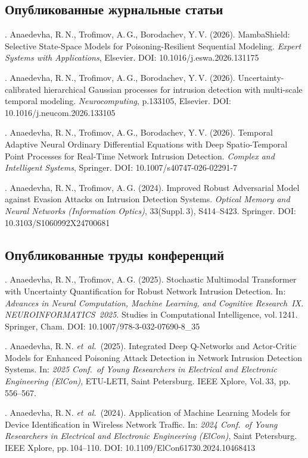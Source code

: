 \subsection*{Опубликованные журнальные статьи}

. Anaedevha, R.\,N., Trofimov, A.\,G., Borodachev, Y.\,V. (2026). MambaShield: Selective State-Space Models for Poisoning-Resilient Sequential Modeling. \textit{Expert Systems with Applications}, Elsevier. DOI: 10.1016/j.eswa.2026.131175

. Anaedevha, R.\,N., Trofimov, A.\,G., Borodachev, Y.\,V. (2026). Uncertainty-calibrated hierarchical Gaussian processes for intrusion detection with multi-scale temporal modeling. \textit{Neurocomputing}, p.133105, Elsevier. DOI: 10.1016/j.neucom.2026.133105

. Anaedevha, R.\,N., Trofimov, A.\,G., Borodachev, Y.\,V. (2026). Temporal Adaptive Neural Ordinary Differential Equations with Deep Spatio-Temporal Point Processes for Real-Time Network Intrusion Detection. \textit{Complex and Intelligent Systems}, Springer. DOI: 10.1007/s40747-026-02291-7

. Anaedevha, R.\,N., Trofimov, A.\,G. (2024). Improved Robust Adversarial Model against Evasion Attacks on Intrusion Detection Systems. \textit{Optical Memory and Neural Networks (Information Optics)}, 33(Suppl.\,3), S414--S423. Springer. DOI: 10.3103/S1060992X24700681

\subsection*{Опубликованные труды конференций}

. Anaedevha, R.\,N., Trofimov, A.\,G. (2025). Stochastic Multimodal Transformer with Uncertainty Quantification for Robust Network Intrusion Detection. In: \textit{Advances in Neural Computation, Machine Learning, and Cognitive Research~IX. NEUROINFORMATICS~2025}. Studies in Computational Intelligence, vol.\,1241. Springer, Cham. DOI: 10.1007/978-3-032-07690-8\_35

. Anaedevha, R.\,N. \textit{et~al.}\ (2025). Integrated Deep Q-Networks and Actor-Critic Models for Enhanced Poisoning Attack Detection in Network Intrusion Detection Systems. In: \textit{2025 Conf.\ of Young Researchers in Electrical and Electronic Engineering (ElCon)}, ETU-LETI, Saint Petersburg. IEEE Xplore, Vol.\,33, pp.\,556--567.

. Anaedevha, R.\,N. \textit{et~al.}\ (2024). Application of Machine Learning Models for Device Identification in Wireless Network Traffic. In: \textit{2024 Conf.\ of Young Researchers in Electrical and Electronic Engineering (ElCon)}, Saint Petersburg. IEEE Xplore, pp.\,104--110. DOI: 10.1109/ElCon61730.2024.10468413

